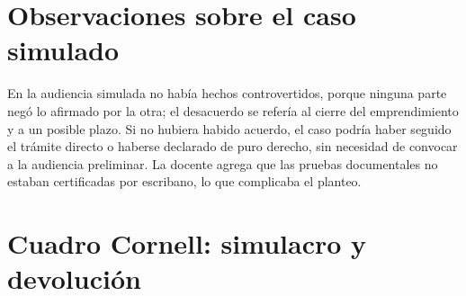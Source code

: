 \documentclass[12pt,oneside]{book}
\begin{document}
\section{Observaciones sobre el caso simulado}

En la audiencia simulada no había hechos controvertidos, porque ninguna parte negó lo afirmado por la otra; el desacuerdo se refería al cierre del emprendimiento y a un posible plazo. Si no hubiera habido acuerdo, el caso podría haber seguido el trámite directo o haberse declarado de puro derecho, sin necesidad de convocar a la audiencia preliminar. La docente agrega que las pruebas documentales no estaban certificadas por escribano, lo que complicaba el planteo.


\section{Cuadro Cornell: simulacro y devolución}
\end{document}

